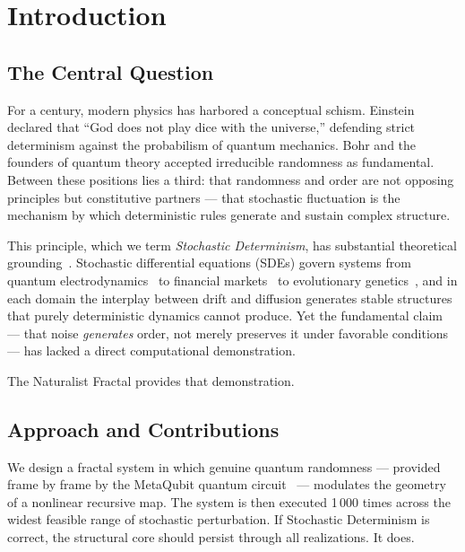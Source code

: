 \documentclass[twocolumn,amsmath,amssymb,prl]{revtex4-2}
\begin{document}

\maketitle

\section{Introduction}
\label{sec:intro}

\subsection{The Central Question}

For a century, modern physics has harbored a conceptual schism.  Einstein
declared that ``God does not play dice with the universe,'' defending strict
determinism against the probabilism of quantum mechanics.  Bohr and the
founders of quantum theory accepted irreducible randomness as fundamental.
Between these positions lies a third: that randomness and order are not
opposing principles but constitutive partners — that stochastic fluctuation
is the mechanism by which deterministic rules generate and sustain complex
structure.

This principle, which we term \emph{Stochastic Determinism}, has substantial
theoretical grounding~\cite{Haken1983,Nicolis1977,Prigogine1984,Mandelbrot1982}.
Stochastic differential equations (SDEs) govern systems from quantum
electrodynamics~\cite{Parisi1981} to financial markets~\cite{Black1973} to
evolutionary genetics~\cite{Kimura1983}, and in each domain the interplay
between drift and diffusion generates stable structures that purely
deterministic dynamics cannot produce.  Yet the fundamental claim —
that noise \emph{generates} order, not merely preserves it under favorable
conditions — has lacked a direct computational demonstration.

The Naturalist Fractal provides that demonstration.

\subsection{Approach and Contributions}

We design a fractal system in which genuine quantum randomness — provided
frame by frame by the MetaQubit quantum circuit~\cite{DemopoulosMetaQubit}
— modulates the geometry of a nonlinear recursive map.  The system is then
executed 1\,000 times across the widest feasible range of stochastic
perturbation.  If Stochastic Determinism is correct, the structural core
should persist through all realizations.  It does.
\end{document}
